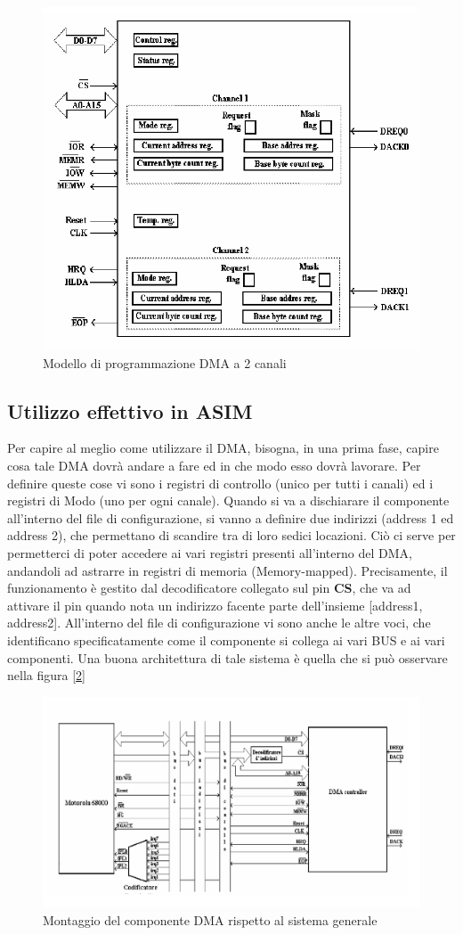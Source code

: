 \begin{figure}
    \centering
    \includegraphics[width=.7\textwidth]{img/DMA.png}
    \caption{Modello di programmazione DMA a 2 canali}\label{img:DMA}
\end{figure}

\subsection{Utilizzo effettivo in ASIM}
Per capire al meglio come utilizzare il DMA, bisogna, in una prima fase, capire cosa tale DMA dovrà andare a fare ed in che modo esso dovrà lavorare. Per definire queste cose vi sono i registri di controllo (unico per tutti i canali) ed i registri di Modo (uno per ogni canale). Quando si va a dischiarare il componente all'interno del file di configurazione, si vanno a definire due indirizzi (address 1 ed address 2), che permettano di scandire tra di loro sedici locazioni. Ciò ci serve per permetterci di poter accedere ai vari registri presenti all'interno del DMA, andandoli ad astrarre in registri di memoria (Memory-mapped). Precisamente, il funzionamento è gestito dal decodificatore collegato sul pin \textbf{CS}, che va ad attivare il pin quando nota un indirizzo facente parte dell'insieme [address1, address2]. All'interno del file di configurazione vi sono anche le altre voci, che identificano specificatamente come il componente si collega ai vari BUS e ai vari componenti. Una buona architettura di tale sistema è quella che si può osservare nella figura [\ref{img:architettura-dma}]

\begin{figure}
    \centering
    \includegraphics[width=.5\textwidth]{img/architettura-dma.png}
    \caption{Montaggio del componente DMA rispetto al sistema generale}\label{img:architettura-dma}
\end{figure}

